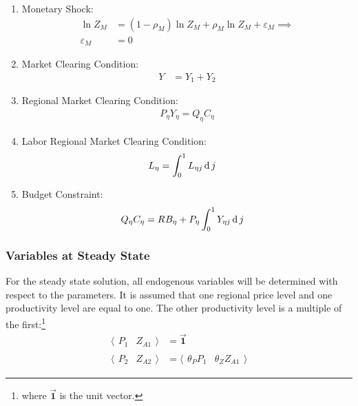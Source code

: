 \documentclass[../thesis.tex]{subfiles}
\begin{document}
\begin{enumerate}
	\item Monetary Shock:
	\begin{align}
		\ln{Z_{M}} &= (1-\rho_M) \ln{Z_{M}} + \rho_M \ln{Z_{M}} + \varepsilon_{M} \implies \nonumber \\
		\varepsilon_{M} &= 0 \label{eq_v6:reg-ss-monetary-shock}
	\end{align}
	
	\item Market Clearing Condition:
	\begin{align}
		Y_{} &= Y_{1} + Y_{2} \label{eq_v6:reg-ss-market-clearing-condition-Yt}
	\end{align}
	
	\item Regional Market Clearing Condition: 
	\begin{align}
		P_{\eta} Y_{\eta} = Q_{\eta} C_{\eta} \label{eq_v6:reg-ss-regional-demand}
	\end{align}
	
	\item Labor Regional Market Clearing Condition: 
	\begin{align}
		L_{\eta} &= \int_{0}^{1} L_{\eta j} \operatorname{d} j \label{eq_v6:reg-ss-market-clearing-condition-Lt}
	\end{align}

	\item Budget Constraint:
	\begin{align}
		Q_{\eta} C_{\eta} &= R_{} B_{\eta} + P_{\eta} \int_{0}^{1} Y_{\eta j} \operatorname{d} j \label{eq_v6:reg-ss-budget-constraint-2}
	\end{align}
	
\end{enumerate}
	
	

\newpage


\subsubsection{Variables at Steady State}

	For the steady state solution, all endogenous variables will be determined with respect to the parameters. It is assumed that one regional price level and one productivity level are equal to one. The other productivity level is a multiple of the first:\footnote{where $\vec{\bm{1}}$ is the unit vector.}
	\begin{align}
		\langle \begin{matrix} P_{1} & Z_{A1} \end{matrix} \rangle &= \vec{\bm{1}} \label{eq_v6:reg-ss-p1-za1} 
		\\ 
		\langle \begin{matrix} P_{2} & Z_{A2} \end{matrix} \rangle &= \langle \begin{matrix} \theta_{P} P_{1} & \theta_{Z} Z_{A1} \end{matrix} \rangle \label{eq_v6:reg-ss-p2-za2}
	\end{align}
	
\end{document}
